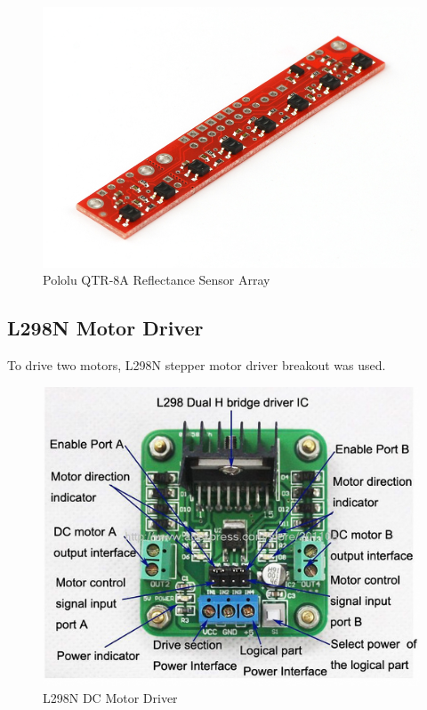 \documentclass[14pt,a4paper]{extarticle}
\begin{document}
	\begin{figure}[H]
		\includegraphics[scale=.28, center]{qtr.jpg}
		\caption{Pololu QTR-8A Reflectance Sensor Array}
	\end{figure}
	
	\subsection{L298N Motor Driver}
	
	To drive two motors, L298N stepper motor driver breakout was used.
	
	\begin{figure}[H]
		\includegraphics[scale=0.5,center]{l298n.jpg}
		\caption{L298N DC Motor Driver}
	\end{figure}
	
\end{document}
